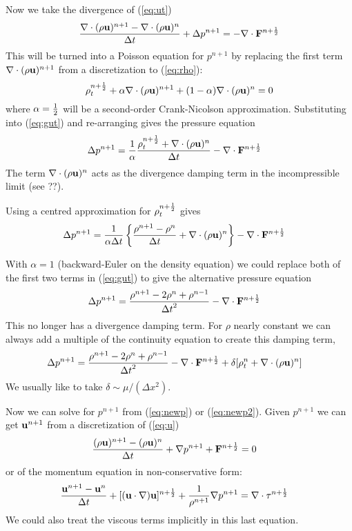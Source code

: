 \documentclass{article}
\begin{document}
Now we take the divergence of (\ref{eq:ut}) 
\begin{align}
  {\nabla\cdot(\rho{\bf u})^{n+1} - \nabla\cdot(\rho{\bf u})^{n} \over {\Delta t}}
       + \Delta p^{n+1}  = -\nabla\cdot{\bf F}^{n+{1\over2}}   \label{eq:gut}
\end{align}
This will be turned into a Poisson equation for $p^{n+1}$ by replacing the first 
term $\nabla\cdot(\rho{\bf u})^{n+1}$ from a discretization to (\ref{eq:rho}):
\[
  \rho_t^{n+{1\over2}}  + \alpha \nabla\cdot( \rho{\bf u} )^{n+1} + (1-\alpha) \nabla\cdot( \rho{\bf u} )^{n}= 0
\]
where $\alpha={1\over2}$ will be a second-order Crank-Nicolson approximation. Substituting into (\ref{eq:gut})
and re-arranging gives the pressure equation
\begin{align*}
   \Delta p^{n+1} & = { 1\over\alpha} { \rho_t^{n+{1\over2}} + \nabla\cdot( \rho{\bf u} )^{n} \over {\Delta t}} 
                      - \nabla\cdot{\bf F} ^{n+{1\over2}}   \label{eq:newp}
\end{align*}
The term $\nabla\cdot( \rho{\bf u} )^{n}$ 
acts as the divergence damping term in the incompressible limit (see ??).

Using a centred approximation for $\rho_t^{n+{1\over2}}$ gives 
\begin{align}
   \Delta p^{n+1} & = { 1\over \alpha  {\Delta t}} \left\{ {\rho^{n+1}-\rho^n \over {\Delta t}} + \nabla\cdot( \rho{\bf u} )^{n} \right\} 
                      - \nabla\cdot{\bf F} ^{n+{1\over2}}  
\end{align}


With $\alpha=1$ (backward-Euler on the density equation) 
we could replace both of the first two terms in (\ref{eq:gut}) to give the alternative pressure
equation
\begin{align*}
   \Delta p^{n+1} &= { \rho^{n+1} -2\rho^n + \rho^{n-1} \over {\Delta t}^2 }
                         -  \nabla\cdot{\bf F}^{n+{1\over2}}         
\end{align*}
This no longer has a divergence damping term. For $\rho$ nearly constant we can always
add a multiple of the continuity equation to create this damping term,
\begin{align*}
   \Delta p^{n+1} & = { \rho^{n+1} -2\rho^n + \rho^{n-1} \over {\Delta t}^2 } -  \nabla\cdot{\bf F}^{n+{1\over2}}  
                + \delta[ \rho_t^{n} + \nabla\cdot(\rho{\bf u})^n ]  \label{eq:newp2}
\end{align*}
We usually like to take $\delta\sim \mu/(\Delta x ^2)$.


Now we can solve for $p^{n+1}$ from (\ref{eq:newp}) or (\ref{eq:newp2}).
Given $p^{n+1}$ we can get ${\bf u}^{n+1}$ from a discretization of (\ref{eq:u}) 
\begin{align*}
  {(\rho{\bf u})^{n+1} - (\rho{\bf u})^n \over {\Delta t}} + \nabla p^{n+1} + {\bf F}^{n+{1\over2}} &= 0
\end{align*}
or of the momentum
equation in non-conservative form:
\begin{align*}
  {{\bf u}^{n+1} - {\bf u}^n \over {\Delta t}} + [({\bf u}\cdot\nabla){\bf u}]^{n+{1\over2}} + {1\over\rho^{n+1}} \nabla p^{n+1}
         &=  \nabla\cdot {\bf \tau}^{n+{1\over2}} 
\end{align*}
We could also treat the viscous terms implicitly in this last equation.





\end{document}
